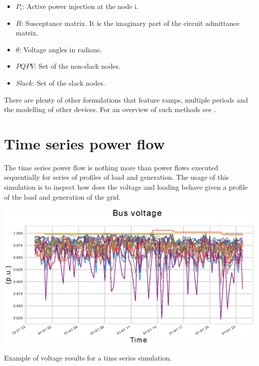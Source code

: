 \documentclass[a4paper,twoside,fleqn]{tufte-book}
\begin{document}
\begin{itemize}
	\item $P_i$: Active power injection at the node i.
	\item $B$: Susceptance matrix. It is the imaginary part of the circuit admittance matrix.
	\item $\theta$: Voltage angles in radians.
	\item $PQPV$: Set of the non-slack nodes.
	
	\item $Slack$: Set of the slack nodes.
\end{itemize}

There are plenty of other formulations that feature ramps, multiple periods and the modelling of other devices.
For an overview of such methods see \cite{taylor2015convex}.

\chapter{Time series power flow}

The time series power flow is nothing more than power flows executed sequentially for series of profiles of load and generation. The usage of this simulation is to inspect how does the voltage and loading behave given a profile of the load and generation of the grid.

\begin{marginfigure}
	\includegraphics[width=\linewidth]{img/Time_series.eps}
	\caption{Example of voltage results for a time series simulation.}
	\label{fig:time_series}
\end{marginfigure}
\end{document}
